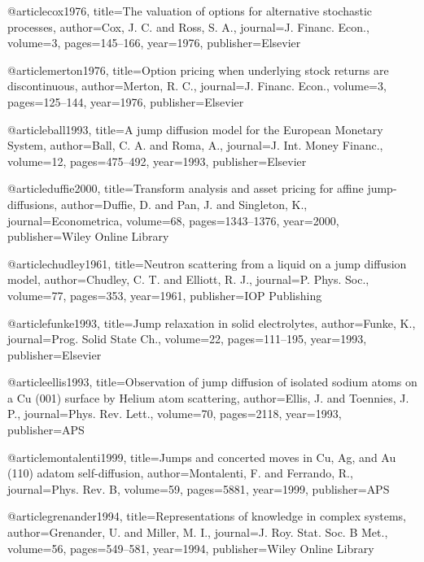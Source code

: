 @article{cox1976,
  title={{The valuation of options for alternative stochastic processes}},
  author={Cox, J. C. and Ross, S. A.},
  journal={J. Financ. Econ.},
  volume={3},
  pages={145--166},
  year={1976},
  publisher={Elsevier}
}

@article{merton1976,
  title={{Option pricing when underlying stock returns are discontinuous}},
  author={Merton, R. C.},
  journal={J. Financ. Econ.},
  volume={3},
  pages={125--144},
  year={1976},
  publisher={Elsevier}
}

@article{ball1993,
  title={{A jump diffusion model for the European Monetary System}},
  author={Ball, C. A. and Roma, A.},
  journal={J. Int. Money Financ.},
  volume={12},
  pages={475--492},
  year={1993},
  publisher={Elsevier}
}

@article{duffie2000,
  title={{Transform analysis and asset pricing for affine jump-diffusions}},
  author={Duffie, D. and Pan, J. and Singleton, K.},
  journal={Econometrica},
  volume={68},
  pages={1343--1376},
  year={2000},
  publisher={Wiley Online Library}
}

@article{chudley1961,
  title={{Neutron scattering from a liquid on a jump diffusion model}},
  author={Chudley, C. T. and Elliott, R. J.},
  journal={P. Phys. Soc.},
  volume={77},
  pages={353},
  year={1961},
  publisher={IOP Publishing}
}

@article{funke1993,
  title={Jump relaxation in solid electrolytes},
  author={Funke, K.},
  journal={Prog. Solid State Ch.},
  volume={22},
  pages={111--195},
  year={1993},
  publisher={Elsevier}
}

@article{ellis1993,
  title={{Observation of jump diffusion of isolated sodium atoms on a Cu (001) surface by Helium atom scattering}},
  author={Ellis, J. and Toennies, J. P.},
  journal={Phys. Rev. Lett.},
  volume={70},
  pages={2118},
  year={1993},
  publisher={APS}
}

@article{montalenti1999,
  title={{Jumps and concerted moves in Cu, Ag, and Au (110) adatom self-diffusion}},
  author={Montalenti, F. and Ferrando, R.},
  journal={Phys. Rev. B},
  volume={59},
  pages={5881},
  year={1999},
  publisher={APS}
}

@article{grenander1994,
  title={{Representations of knowledge in complex systems}},
  author={Grenander, U. and Miller, M. I.},
  journal={J. Roy. Stat. Soc. B Met.},
  volume={56},
  pages={549--581},
  year={1994},
  publisher={Wiley Online Library}
}

